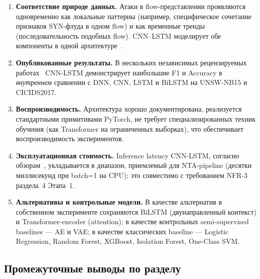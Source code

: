 \begin{enumerate}
    \item \textbf{Соответствие природе данных.} Атаки в flow-представлении
    проявляются одновременно как локальные паттерны (например, специфическое
    сочетание признаков SYN-флуда в одном flow) и как временные тренды
    (последовательность подобных flow). CNN--LSTM моделирует обе компоненты
    в одной архитектуре~\cite{vinayakumar2019dl, ferrag2020dlcyber}.
    \item \textbf{Опубликованные результаты.} В нескольких независимых
    рецензируемых работах~\cite{vinayakumar2019dl, ferrag2020dlcyber,
    liu2019survey, ahmad2021nids} CNN-LSTM демонстрирует наибольшие F1 и
    Accuracy в \emph{внутреннем} сравнении с DNN, CNN, LSTM и BiLSTM
    на UNSW-NB15 и CICIDS2017.
    \item \textbf{Воспроизводимость.} Архитектура хорошо документирована,
    реализуется стандартными примитивами PyTorch, не требует
    специализированных техник обучения (как Transformer на ограниченных
    выборках), что обеспечивает воспроизводимость экспериментов.
    \item \textbf{Эксплуатационная стоимость.} Inference latency
    CNN-LSTM, согласно обзорам~\cite{ferrag2020dlcyber, ahmad2021nids},
    укладывается в диапазон, приемлемый для NTA-pipeline (десятки
    миллисекунд при batch=1 на CPU); это совместимо с требованием NFR-3
    раздела~4 Этапа~1.
    \item \textbf{Альтернативы и контрольные модели.} В качестве альтернатив
    в собственном эксперименте сохраняются BiLSTM (двунаправленный контекст)
    и Transformer-encoder (attention); в качестве контрольных
    semi-supervised baselines --- AE и VAE; в качестве классических baseline
    --- Logistic Regression, Random Forest, XGBoost, Isolation Forest,
    One-Class SVM.
\end{enumerate}

\subsection{Промежуточные выводы по разделу}

